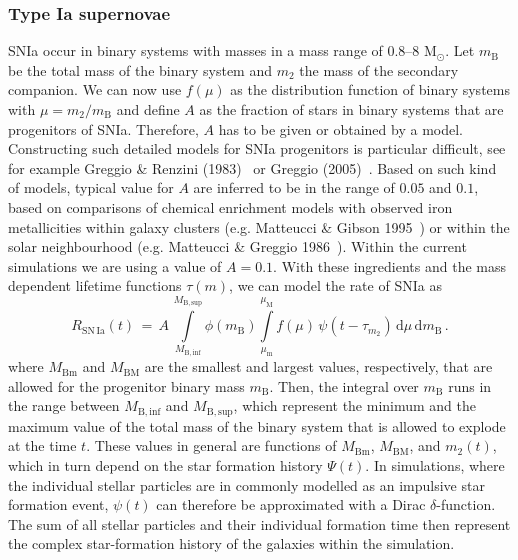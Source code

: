 \documentclass[galaxies,letter,accept,moreauthors,pdftex,10pt,a4paper,usenatbib]{mdpi}
\begin{document}
\subsubsection{Type Ia supernovae}
SNIa occur in binary systems with masses in a mass range of 0.8--8
M$_\odot$. Let $m_{\mathrm B}$ be the total mass of the binary system
and $m_2$ the mass of the secondary companion. We can now use $f(\mu)$
as the distribution function of binary systems with
$\mu=m_2/m_{\mathrm B}$ and define $A$ as the fraction of stars in
binary systems that are progenitors of SNIa. Therefore, $A$ has to be
given or obtained by a model. Constructing such detailed models for
SNIa progenitors is particular difficult, see for example Greggio \& Renzini
(1983)~\cite{1983A&A...118..217G} or Greggio (2005)~\cite{2005A&A...441.1055G}. 
Based on such kind of models, typical value for $A$ are inferred to be
in the range of $0.05$ and $0.1$, based on comparisons of chemical enrichment
models with observed iron metallicities within galaxy clusters (e.g. Matteucci
\& Gibson 1995~\cite{1995A&A...304...11M}) or within the solar neighbourhood
(e.g. Matteucci \& Greggio 1986~\cite{1986A&A...154..279M}). Within the current
simulations we are using a value of $A=0.1$.
With these ingredients and the mass dependent lifetime functions
$\tau(m)$, we can model the rate of SNIa as
\begin{equation}
R_{{\mathrm{SN\,Ia}}}(t) \, = \,
A\,\int\limits_{\displaystyle{M_{\mathrm{B,inf}}}}^{\displaystyle{M_{\mathrm{B,sup}}}}
\phi(m_{\mathrm B})
\int\limits_{\displaystyle{\mu_{\mathrm m}}}^{\displaystyle{\mu_{\mathrm M}}} 
f(\mu)\,
\psi(t-\tau_{m_2})\,{\mathrm d}\mu\,{\mathrm d}m_{\mathrm B}\,.
\end{equation}
where $M_{\mathrm{Bm}}$ and $M_{\mathrm{BM}}$ are the smallest and
largest values, respectively, that are allowed for the progenitor binary mass $m_{\mathrm B}$.
Then, the integral over $m_{\mathrm B}$ runs in the range between $M_{\mathrm{B,inf}}$ and
$M_{\mathrm{B,sup}}$, which represent the minimum and the maximum value of the
total mass of the binary system that is allowed to explode at the time
$t$. These values in general are functions of $M_{\mathrm{Bm}}$, $M_{\mathrm{BM}}$, and
$m_2(t)$, which in turn depend on the star formation history
$\Psi(t)$. In simulations, where the individual stellar particles are in commonly modelled
as an impulsive star formation event, $\psi(t)$ can therefore be approximated with a Dirac
$\delta$-function. The sum of all stellar particles and their individual formation time then
represent the complex star-formation history of the galaxies within the simulation.
\end{document}
